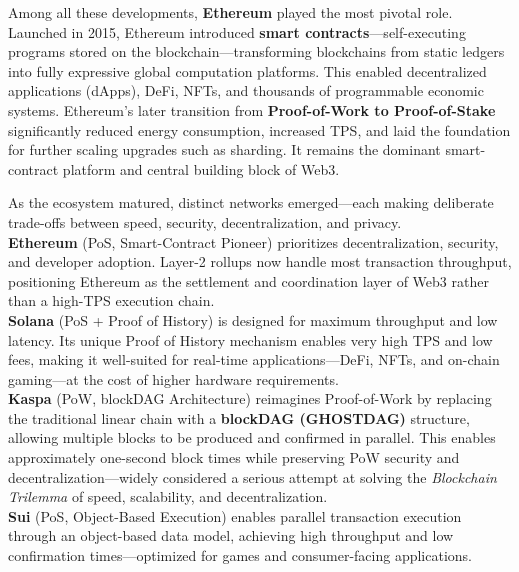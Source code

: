 \documentclass[12pt, a4paper, oneside]{report}
\theoremstyle{definition}
\begin{document}
Among all these developments, \textbf{Ethereum} played the most pivotal role. 
Launched in 2015, Ethereum introduced \textbf{smart contracts}—self-executing programs 
stored on the blockchain—transforming blockchains from static ledgers into fully 
expressive global computation platforms. This enabled decentralized applications 
(dApps), DeFi, NFTs, and thousands of programmable economic systems. Ethereum's later 
transition from \textbf{Proof-of-Work to Proof-of-Stake} significantly reduced energy 
consumption, increased TPS, and laid the foundation for further scaling upgrades such 
as sharding. It remains the dominant smart-contract platform and central building block 
of Web3.


\label{sec:networks}

As the ecosystem matured, distinct networks emerged—each making deliberate trade-offs 
between speed, security, decentralization, and privacy.\\[0.4cm]

\textbf{Ethereum} (PoS, Smart-Contract Pioneer) prioritizes decentralization, security, 
and developer adoption. Layer-2 rollups now handle most transaction throughput, 
positioning Ethereum as the settlement and coordination layer of Web3 rather than a 
high-TPS execution chain.\\[0.4cm]

\textbf{Solana} (PoS + Proof of History) is designed for maximum throughput and low 
latency. Its unique Proof of History mechanism enables very high TPS and low fees, 
making it well-suited for real-time applications—DeFi, NFTs, and on-chain gaming—at 
the cost of higher hardware requirements.\\[0.4cm]

\textbf{Kaspa} (PoW, blockDAG Architecture) reimagines Proof-of-Work by replacing 
the traditional linear chain with a \textbf{blockDAG (GHOSTDAG)} structure, allowing 
multiple blocks to be produced and confirmed in parallel. This enables approximately 
one-second block times while preserving PoW security and decentralization—widely 
considered a serious attempt at solving the \emph{Blockchain Trilemma} of speed, 
scalability, and decentralization.\\[0.4cm]

\textbf{Sui} (PoS, Object-Based Execution) enables parallel transaction execution 
through an object-based data model, achieving high throughput and low confirmation 
times—optimized for games and consumer-facing applications.\\[0.4cm]
\end{document}
